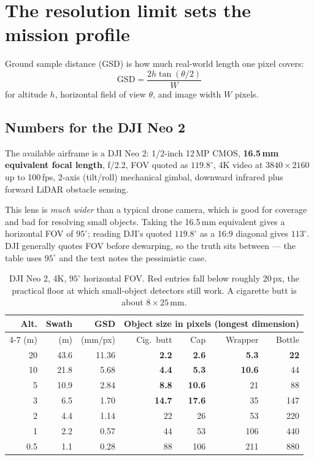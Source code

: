 \documentclass[11pt,a4paper]{article}
\newcommand{\gap}[1]{\textcolor{warn}{\textbf{#1}}}
\begin{document}
\section{The resolution limit sets the mission profile}
\label{sec:gsd}

Ground sample distance (GSD) is how much real-world length one pixel covers:
\[
\mathrm{GSD} = \frac{2h\tan(\theta/2)}{W}
\]
for altitude $h$, horizontal field of view $\theta$, and image width $W$ pixels.

\subsection{Numbers for the DJI Neo 2}

The available airframe is a DJI Neo 2: 1/2-inch 12\,MP CMOS, \textbf{16.5\,mm
equivalent focal length}, f/2.2, FOV quoted as $119.8^\circ$, 4K video at
$3840\times2160$ up to 100\,fps, 2-axis (tilt/roll) mechanical gimbal, downward
infrared plus forward LiDAR obstacle sensing.

This lens is \emph{much wider} than a typical drone camera, which is good for
coverage and bad for resolving small objects. Taking the 16.5\,mm equivalent
gives a horizontal FOV of $95^\circ$; reading DJI's quoted $119.8^\circ$ as a
16:9 diagonal gives $113^\circ$. DJI generally quotes FOV before dewarping, so
the truth sits between --- the table uses $95^\circ$ and the text notes the
pessimistic case.

\begin{table}[H]
\centering
\begin{tabular}{rrr rrrr}
\toprule
\textbf{Alt.} & \textbf{Swath} & \textbf{GSD} & \multicolumn{4}{c}{\textbf{Object size in pixels (longest dimension)}} \\
\cmidrule(l){4-7}
(m) & (m) & (mm/px) & Cig.\ butt & Cap & Wrapper & Bottle \\
\midrule
20   & 43.6 & 11.36 & \gap{2.2}  & \gap{2.6}  & \gap{5.3}  & \gap{22} \\
10   & 21.8 & 5.68  & \gap{4.4}  & \gap{5.3}  & \gap{10.6} & 44 \\
5    & 10.9 & 2.84  & \gap{8.8}  & \gap{10.6} & 21         & 88 \\
3    & 6.5  & 1.70  & \gap{14.7} & \gap{17.6} & 35         & 147 \\
2    & 4.4  & 1.14  & 22         & 26         & 53         & 220 \\
1    & 2.2  & 0.57  & 44         & 53         & 106        & 440 \\
0.5  & 1.1  & 0.28  & 88         & 106        & 211        & 880 \\
\bottomrule
\end{tabular}
\caption{DJI Neo 2, 4K, $95^\circ$ horizontal FOV. Red entries fall below
roughly 20\,px, the practical floor at which small-object detectors still work.
A cigarette butt is about $8\times25$\,mm.}
\end{table}
\end{document}

